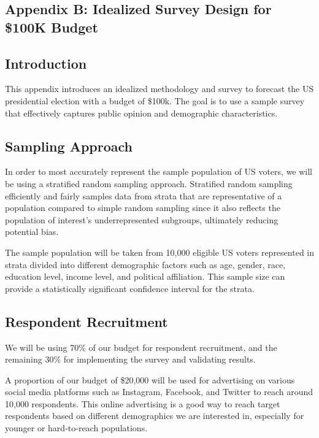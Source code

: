 \documentclass[
  letterpaper,
  DIV=11,
  numbers=noendperiod]{scrartcl}
\begin{document}
\subsection{Appendix B: Idealized Survey Design for \$100K
Budget}\label{appendix-b-idealized-survey-design-for-100k-budget}

\subsection{Introduction}\label{introduction-1}

This appendix introduces an idealized methodology and survey to forecast
the US presidential election with a budget of \$100k. The goal is to use
a sample survey that effectively captures public opinion and demographic
characteristics.

\subsection{Sampling Approach}\label{sampling-approach}

In order to most accurately represent the sample population of US
voters, we will be using a stratified random sampling approach.
Stratified random sampling efficiently and fairly samples data from
strata that are representative of a population compared to simple random
sampling since it also reflects the population of interest's
underrepresented subgroups, ultimately reducing potential bias.

The sample population will be taken from 10,000 eligible US voters
represented in strata divided into different demographic factors such as
age, gender, race, education level, income level, and political
affiliation. This sample size can provide a statistically significant
confidence interval for the strata.

\subsection{Respondent Recruitment}\label{respondent-recruitment}

We will be using 70\% of our budget for respondent recruitment, and the
remaining 30\% for implementing the survey and validating results.

A proportion of our budget of \$20,000 will be used for advertising on
various social media platforms such as Instagram, Facebook, and Twitter
to reach around 10,000 respondents. This online advertising is a good
way to reach target respondents based on different demographics we are
interested in, especially for younger or hard-to-reach populations.
\end{document}
